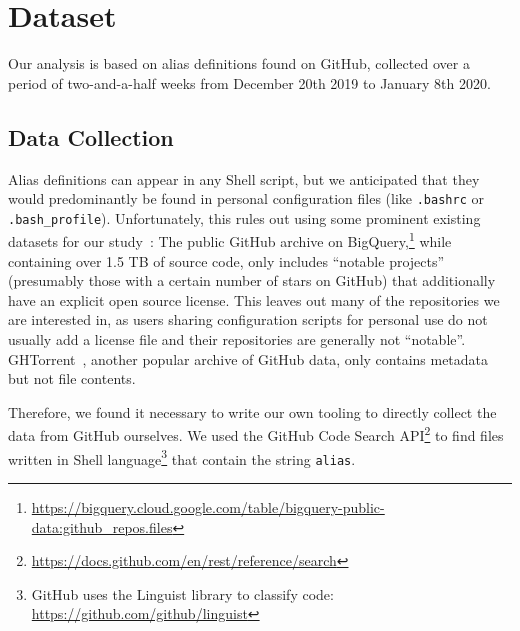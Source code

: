 \documentclass[smallextended,natbib]{svjour3}
\newcommand{\num}[1]{\numprint{#1}}
\begin{document}
\section{Dataset}

Our analysis is based on \num{2204199} alias definitions found on GitHub, collected over a period of two-and-a-half weeks from December 20th 2019 to January 8th 2020.

\subsection{Data Collection}

Alias definitions can appear in any Shell script, but we anticipated that they would predominantly be found in personal configuration files (like \verb|.bashrc| or \verb|.bash_profile|).
Unfortunately, this rules out using some prominent existing datasets for our study~\citep{mombach}:
The public GitHub archive on BigQuery,\footnote{\url{https://bigquery.cloud.google.com/table/bigquery-public-data:github_repos.files}} while containing over 1.5 TB of source code, only includes ``notable projects'' (presumably those with a certain number of stars on GitHub) that additionally have an explicit open source license. 
This leaves out many of the repositories we are interested in, as users sharing configuration scripts for personal use do not usually add a license file and their repositories are generally not ``notable''.
GHTorrent~\citep{ghtorrent}, another popular archive of GitHub data, only contains metadata but not file contents.

Therefore, we found it necessary to write our own tooling to directly collect the data from GitHub ourselves.
We used the GitHub Code Search API\footnote{\url{https://docs.github.com/en/rest/reference/search}} to find files written in Shell language\footnote{GitHub uses the Linguist library to classify code: \url{https://github.com/github/linguist}} that contain the string \verb|alias|.
\end{document}
